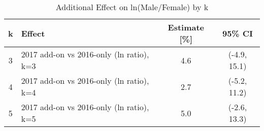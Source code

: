 \begin{table}[!ht]
\centering
\caption{Additional Effect on ln(Male/Female) by k}
\begin{tabular}{clcc}
\hline
k & Effect & Estimate [\%] & 95\% CI \\
\hline
3 & 2017 add-on vs 2016-only (ln ratio), k=3 & 4.6 & (-4.9, 15.1) \\
4 & 2017 add-on vs 2016-only (ln ratio), k=4 & 2.7 & (-5.2, 11.2) \\
5 & 2017 add-on vs 2016-only (ln ratio), k=5 & 5.0 & (-2.6, 13.3) \\
\hline
\end{tabular}
\end{table}
